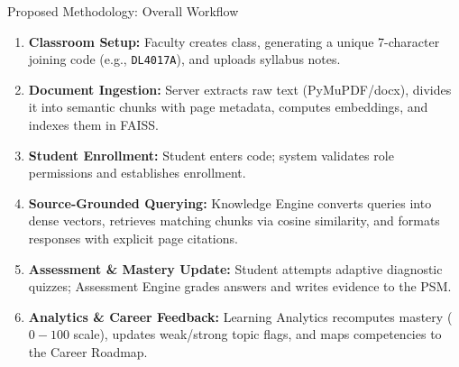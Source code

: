 \documentclass[aspectratio=169,10pt]{beamer}
\begin{document}
\begin{frame}{Proposed Methodology: Overall Workflow}
  \begin{enumerate}
    \item \textbf{Classroom Setup:} Faculty creates class, generating a unique 7-character joining code (e.g., \texttt{DL4017A}), and uploads syllabus notes.
    \item \textbf{Document Ingestion:} Server extracts raw text (PyMuPDF/docx), divides it into semantic chunks with page metadata, computes embeddings, and indexes them in FAISS.
    \item \textbf{Student Enrollment:} Student enters code; system validates role permissions and establishes enrollment.
    \item \textbf{Source-Grounded Querying:} Knowledge Engine converts queries into dense vectors, retrieves matching chunks via cosine similarity, and formats responses with explicit page citations.
    \item \textbf{Assessment \& Mastery Update:} Student attempts adaptive diagnostic quizzes; Assessment Engine grades answers and writes evidence to the PSM.
    \item \textbf{Analytics \& Career Feedback:} Learning Analytics recomputes mastery ($0-100$ scale), updates weak/strong topic flags, and maps competencies to the Career Roadmap.
  \end{enumerate}
\end{frame}
\end{document}
